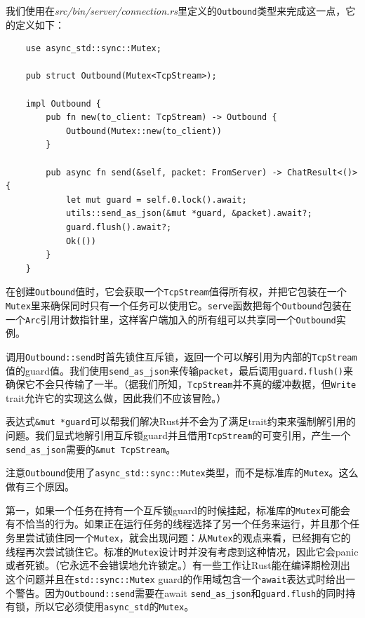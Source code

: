 我们使用在\emph{src/bin/server/connection.rs}里定义的\texttt{Outbound}类型来完成这一点，它的定义如下：
\begin{verbatim}
    use async_std::sync::Mutex;

    pub struct Outbound(Mutex<TcpStream>);

    impl Outbound {
        pub fn new(to_client: TcpStream) -> Outbound {
            Outbound(Mutex::new(to_client))
        }

        pub async fn send(&self, packet: FromServer) -> ChatResult<()> {
            let mut guard = self.0.lock().await;
            utils::send_as_json(&mut *guard, &packet).await?;
            guard.flush().await?;
            Ok(())
        }
    }
\end{verbatim}

在创建\texttt{Outbound}值时，它会获取一个\texttt{TcpStream}值得所有权，并把它包装在一个\texttt{Mutex}里来确保同时只有一个任务可以使用它。\texttt{serve}函数把每个\texttt{Outbound}包装在一个\texttt{Arc}引用计数指针里，这样客户端加入的所有组可以共享同一个\texttt{Outbound}实例。

调用\texttt{Outbound::send}时首先锁住互斥锁，返回一个可以解引用为内部的\texttt{TcpStream}值的guard值。我们使用\texttt{send\_as\_json}来传输\texttt{packet}，最后调用\texttt{guard.flush()}来确保它不会只传输了一半。（据我们所知，\texttt{TcpStream}并不真的缓冲数据，但\texttt{Write} trait允许它的实现这么做，因此我们不应该冒险。）

表达式\texttt{\&mut *guard}可以帮我们解决Rust并不会为了满足trait约束来强制解引用的问题。我们显式地解引用互斥锁guard并且借用\texttt{TcpStream}的可变引用，产生一个\texttt{send\_as\_json}需要的\texttt{\&mut TcpStream}。

注意\texttt{Outbound}使用了\texttt{async\_std::sync::Mutex}类型，而不是标准库的\texttt{Mutex}。这么做有三个原因。

第一，如果一个任务在持有一个互斥锁guard的时候挂起，标准库的\texttt{Mutex}可能会有不恰当的行为。如果正在运行任务的线程选择了另一个任务来运行，并且那个任务里尝试锁住同一个\texttt{Mutex}，就会出现问题：从\texttt{Mutex}的观点来看，已经拥有它的线程再次尝试锁住它。标准的\texttt{Mutex}设计时并没有考虑到这种情况，因此它会panic或者死锁。（它永远不会错误地允许锁定。）有一些工作让Rust能在编译期检测出这个问题并且在\texttt{std::sync::Mutex} guard的作用域包含一个\texttt{await}表达式时给出一个警告。因为\texttt{Outbound::send}需要在await \texttt{send\_as\_json}和\texttt{guard.flush}的同时持有锁，所以它必须使用\texttt{async\_std}的\texttt{Mutex}。

